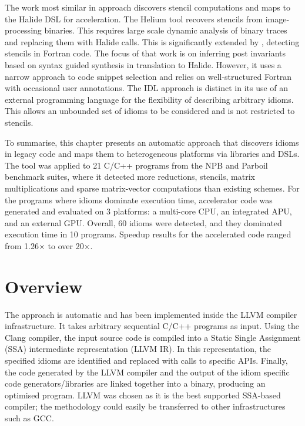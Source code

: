     The work most similar in approach discovers stencil computations and maps to
    the Halide DSL for acceleration.
    The Helium tool \citep{Mendis2015Helium} recovers stencils from
    image-processing binaries.
    This requires large scale dynamic analysis of binary traces and replacing
    them with Halide calls. 
    This is significantly extended by \citet{Kamil2016Verified}, detecting
    stencils in Fortran code.
    The focus of that work is on inferring post invariants based on syntax
    guided synthesis in translation to Halide.
    However, it uses a narrow approach to code snippet selection and relies on
    well-structured Fortran with occasional user annotations.
    The IDL approach is distinct in its use of an external programming language
    for the flexibility of describing arbitrary idioms.
    This allows an unbounded set of idioms to be considered and is not
    restricted to stencils. 

    To summarise, this chapter presents an automatic approach that discovers
    idioms in legacy code and maps them to heterogeneous platforms via libraries
    and DSLs.
    The tool was applied to 21 C/C++ programs from the NPB and Parboil benchmark
    suites, where it detected more reductions, stencils, matrix multiplications
    and sparse matrix-vector computations than existing schemes.
    For the programs where idioms dominate execution time, accelerator code
    was generated and evaluated on 3 platforms: a multi-core CPU, an integrated
    APU, and an external GPU.
    Overall, 60 idioms were detected, and they dominated execution time in
    10 programs.
    Speedup results for the accelerated code ranged from 1.26$\times$ to over
    20$\times$.

\section{Overview}

    The approach is automatic and has been implemented inside the LLVM compiler
    infrastructure.
    It takes arbitrary sequential C/C++ programs as input.
    Using the Clang compiler, the input source code is compiled into a Static
    Single Assignment (SSA) intermediate representation (LLVM IR).
    In this representation, the specified idioms are identified and replaced
    with calls to specific APIs.
    Finally, the code generated by the LLVM compiler and the output of the idiom
    specific code generators/libraries are linked together into a binary,
    producing an optimised program.
    LLVM was chosen as it is the best supported SSA-based compiler;
    the methodology could easily be transferred to other infrastructures such as
    GCC.

